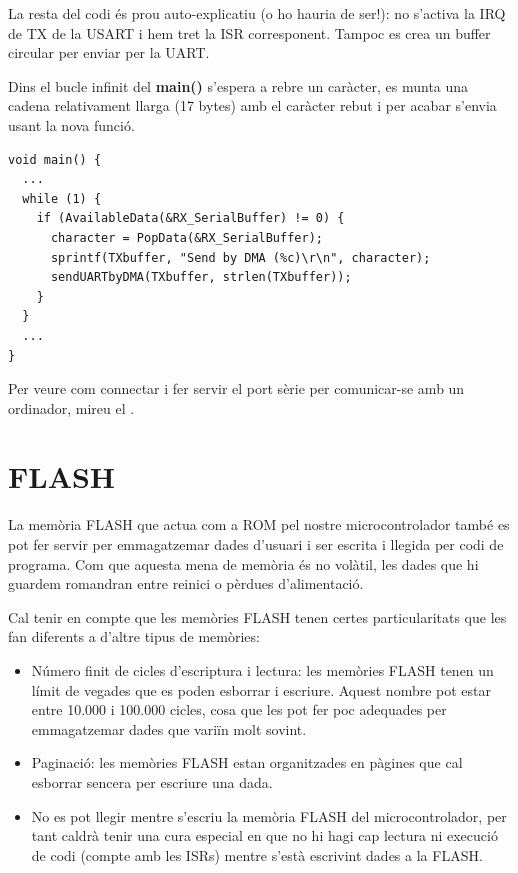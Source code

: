 La resta del codi és prou auto-explicatiu (o ho hauria de ser!): no s'activa la \gls{IRQ} de TX de la USART i hem tret la \gls{ISR} corresponent. Tampoc es crea un \gls{buffer circular} per enviar per la UART.

Dins el bucle infinit del {\bf main()} s'espera a rebre un caràcter, es munta una cadena relativament llarga (17 bytes) amb el caràcter rebut i per acabar s'envia usant la nova funció.
\begin{lstlisting}[style=customc, caption={funció {\bf main()} de l'exemple}]
void main() {
  ...
  while (1) {
    if (AvailableData(&RX_SerialBuffer) != 0) {
      character = PopData(&RX_SerialBuffer);
      sprintf(TXbuffer, "Send by DMA (%c)\r\n", character);
      sendUARTbyDMA(TXbuffer, strlen(TXbuffer));
    }
  }
  ...
}
\end{lstlisting}

Per veure com connectar i fer servir el port sèrie per comunicar-se amb un ordinador, mireu el .

\chapter{FLASH}
\label{ch:FLASH}
La memòria \gls{FLASH} que actua com a \gls{ROM} pel nostre microcontrolador també es pot fer servir per emmagatzemar dades d'usuari i ser escrita i llegida per codi de programa. Com que aquesta mena de memòria és no volàtil, les dades que hi guardem romandran entre reinici o pèrdues d'alimentació.

Cal tenir en compte que les memòries FLASH tenen certes particularitats que les fan diferents a d'altre tipus de memòries:
\begin{itemize}
 \item Número finit de cicles d'escriptura i lectura: les memòries FLASH tenen un límit de vegades que es poden esborrar i escriure. Aquest nombre pot estar entre 10.000 i 100.000 cicles, cosa que les pot fer poc adequades per emmagatzemar dades que variïn molt sovint.
 \item Paginació: les memòries FLASH estan organitzades en pàgines que cal esborrar sencera per escriure una dada.
 \item No es pot llegir mentre s'escriu la memòria FLASH del microcontrolador, per tant caldrà tenir una cura especial en que no hi hagi cap lectura ni execució de codi (compte amb les \glspl{ISR}) mentre s'està escrivint dades a la FLASH.
\end{itemize}

